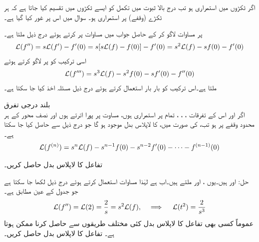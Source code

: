 اگر  ٹکڑوں میں استمراری ہو تب درج بالا ثبوت میں تکمل کو ایسے ٹکڑوں میں تقسیم کیا جاتا ہے کہ ہر ٹکڑے (وقفے) پر  استمراری ہو۔ سوال  میں اس پر غور کیا گیا ہے۔

 پر مساوات   لاگو کر کے حاصل جواب میں مساوات  پر کرتے ہوئے درج ذیل ملتا ہے۔
\begin{align}\label{مساوات_لاپلاس_درجہ_دوم_تفرق}
\mathcal{L}(f'')=s\mathcal{L}(f')-f'(0)=s[s\mathcal{L}(f)-f(0)]-f'(0)=s^2\mathcal{L}(f)-sf(0)-f'(0)
\end{align}
اسی ترکیب کو  پر لاگو کرتے ہوئے
\begin{align}\label{مساوات_لاپلاس_درجہ_تین_تفرق}
\mathcal{L}(f''')=s^3\mathcal{L}(f)-s^2f(0)-sf'(0)-f''(0)
\end{align}
ملتا ہے۔اس ترکیب کو بار بار استعمال کرتے ہوئے درج ذیل مسئلہ اخذ کیا جا سکتا ہے۔

\quad بلند درجی تفرق \\
اگر  اور اس کے تفرقات ، ، ،   تمام  پر استمراری ہوں، مساوت  پر پورا اترتے ہوں اور  نصف محور  کے ہر محدود وقفے پر  ہو تب،  کی صورت میں،  کا لاپلاس بدل موجود ہو گا جو درج ذیل سے حاصل کیا جا سکتا ہے۔
\begin{align}\label{مساوات_لاپلاس_بلند_درجی_تفرق}
\mathcal{L}(f^{(n)})=s^n\mathcal{L}(f)-s^{n-1}f(0)-s^{n-2}f'(0)-\cdots -f^{(n-1)}(0)
\end{align}

تفاعل  کا لاپلاس بدل حاصل کریں۔

حل: اور  ہیں۔یوں ،  اور  ملتے ہیں۔اب  ہے لہٰذا  مساوات  استعمال کرتے ہوئے درج ذیل لکھا جا سکتا ہے جو جدول  کے عین مطابق ہے۔
\begin{align*}
\mathcal{L}(f'')=\mathcal{L}(2)=\frac{2}{s}=s^2\mathcal{L}(f), \quad \implies \quad \mathcal{L}(t^2)=\frac{2}{s^3}
\end{align*}
عموماً کسی بھی تفاعل کا لاپلاس بدل کئی مختلف طریقوں سے حاصل کرنا ممکن ہوتا ہے۔
تفاعل  کا لاپلاس بدل حاصل کریں۔

